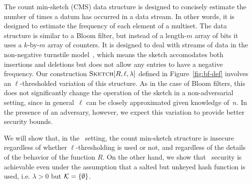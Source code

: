 The count min-sketch (CMS) data structure is designed to concisely estimate the
number of times a datum has occurred in a data stream. In other words, it is
designed to estimate the frequency of each element of a multiset.  The data
structure is similar to a Bloom filter, but instead of a length-$m$ array of
bits it uses a $k$-by-$m$ array of counters. It is designed to deal with streams
of data in the non-negative turnstile model~\cite{cormode2005improved}, which
means the sketch accomodates both insertions and deletions but does not allow
any entries to have a negative frequency. Our construction
$\textnormal{\textsc{Sketch}}[R,\ell,\lambda]$ defined in Figure~\ref{fig:bf-def} involves an
$\ell$-thresholded variation of this structure. As in the case of Bloom filters,
this does not significantly change the operation of the sketch in a
non-adversarial setting, since in general~$\ell$ can be closely approximated
given knowledge of~$n$.
%
%
In the presence of an adversary, however, we expect this variation to provide
better security bounds.
%

We will show that, in the \errep\ setting, the count min-sketch structure is
insecure regardless of whether $\ell$-thresholding is used or not, and
regardless of the details of the behavior of the function $R$. On the other
hand, we show that \erreps\ security is achievable even under the assumption
that a salted but unkeyed hash function is used, i.e. $\lambda > 0$ but $\mathcal{K} =
\{\emptyset\}$.


